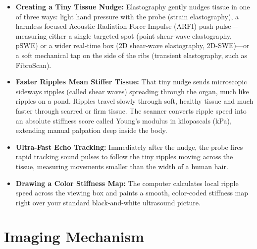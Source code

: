 \begin{itemize}
    \item \textbf{Creating a Tiny Tissue Nudge:} Elastography gently nudges tissue in one of three ways: light hand pressure with the probe (strain elastography), a harmless focused Acoustic Radiation Force Impulse (ARFI) push pulse---measuring either a single targeted spot (point shear-wave elastography, pSWE) or a wider real-time box (2D shear-wave elastography, 2D-SWE)---or a soft mechanical tap on the side of the ribs (transient elastography, such as FibroScan).
    \item \textbf{Faster Ripples Mean Stiffer Tissue:} That tiny nudge sends microscopic sideways ripples (called shear waves) spreading through the organ, much like ripples on a pond. Ripples travel slowly through soft, healthy tissue and much faster through scarred or firm tissue. The scanner converts ripple speed into an absolute stiffness score called Young's modulus in kilopascals (kPa), extending manual palpation deep inside the body.
    \item \textbf{Ultra-Fast Echo Tracking:} Immediately after the nudge, the probe fires rapid tracking sound pulses to follow the tiny ripples moving across the tissue, measuring movements smaller than the width of a human hair.
    \item \textbf{Drawing a Color Stiffness Map:} The computer calculates local ripple speed across the viewing box and paints a smooth, color-coded stiffness map right over your standard black-and-white ultrasound picture.
\end{itemize}

\section{Imaging Mechanism}

